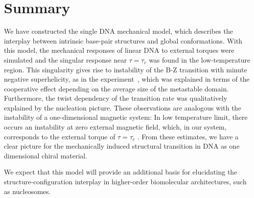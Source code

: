 \documentclass[pre,showpacs,twocolumn,superscriptaddress]{revtex4}
\begin{document}
\section{ Summary}
We have constructed the single DNA mechanical model,
which describes the interplay between intrinsic base-pair structures and
global conformations.
With this model,
the mechanical responses of linear DNA to external torques
were simulated and
the singular response near $\tau=\tau_c$
was found
 in the low-temperature region. 
This singularity 
gives rise to instability of the B-Z transition
with minute negative superhelicity, as in the experiment~\cite{BZtrans},
which was explained in terms of
the cooperative effect depending on the average size of the metastable domain.
Furthermore,
the twist dependency of the transition rate was qualitatively explained by
the nucleation picture.
These observations are analogous with the instability of 
a one-dimensional magnetic system:
In low temperature limit,
there occurs an instability at zero external magnetic field,
which, in our system,
 corresponds to the external torque of  $ \tau = \tau_c $ \cite{oneD}. 
From these estimates, we have a clear picture 
for the mechanically induced structural transition in DNA as
one dimensional chiral material.


We expect that 
this model will provide an additional basis for elucidating
the structure-configuration interplay in higher-order biomolecular architectures, 
such as nucleosomes.
\end{document}
